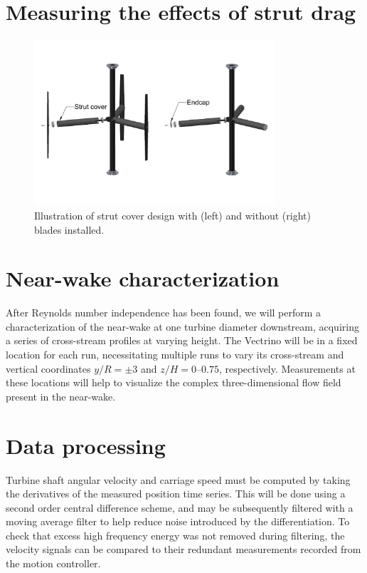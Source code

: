 \documentclass[12pt,letterpaper]{scrreprt}
\begin{document}
\section{Measuring the effects of strut drag}


\begin{figure}[!ht]
\centering
\includegraphics[width=0.8\textwidth]{Figures/strut_covers}
\caption{Illustration of strut cover design with (left) and without (right)
blades installed.}
\label{fig-strut_covers}
\end{figure}

\section{Near-wake characterization}

After Reynolds number independence has been found, we will perform a
characterization of the near-wake at one turbine diameter downstream, acquiring
a series of cross-stream profiles at varying height. The Vectrino will be in a
fixed location for each run, necessitating multiple runs to vary its
cross-stream and vertical coordinates $y/R = \pm 3$ and $z/H = 0$--$0.75$,
respectively. Measurements at these locations will help to visualize the complex
three-dimensional flow field present in the near-wake.

\section{Data processing}

Turbine shaft angular velocity and carriage speed must be computed by taking the
derivatives of the measured position time series. This will be done using a
second order central difference scheme, and may be subsequently filtered with a
moving average filter to help reduce noise introduced by the differentiation. To
check that excess high frequency energy was not removed during filtering, the
velocity signals can be compared to their redundant measurements recorded from
the motion controller.
\end{document}

